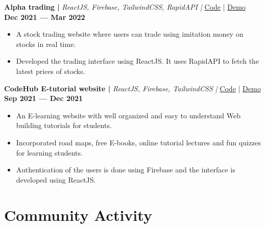 \documentclass[a4,10pt]{article}
\newenvironment{zitemize}{
\begin{itemize}\itemsep0pt \parskip0pt \parsep1pt}
{\end{itemize}\vspace{-0.5cm}}
\begin{document}
    
\vspace{0.35cm}
\textbf{Alpha trading | } \emph{ReactJS, Firebase, TailwindCSS, RapidAPI |  }{\href{https://github.com/Harsh-H-Shah/Alpha-trading}{
            \color{UI_blue} Code}}
            | 
            {\href{https://alpha-trading.netlify.app/}{
            \color{UI_blue} Demo} } \textbf{\hfill Dec 2021 --- Mar 2022} 
\vspace{-0.2cm}
    \begin{zitemize}
        \item A stock trading website where users can trade using imitation money on stocks in real time.
        \item Developed the trading interface using ReactJS. It uses RapidAPI to fetch the latest prices of stocks.
    \end{zitemize}


\vspace{0.35cm}
\textbf{CodeHub E-tutorial website | } \emph{ReactJS, Firebase, TailwindCSS |  }{\href{https://github.com/Harsh-H-Shah/codehub}{
            \color{UI_blue} Code}}
            | 
            {\href{https://code-hub-2021.netlify.app/}{
            \color{UI_blue} Demo} } \textbf{\hfill Sep 2021 --- Dec 2021}
    \vspace{-0.2cm}
    \begin{zitemize}
        \item An E-learning website with well organized and easy to understand Web building tutorials for students.
        \item Incorporated road maps, free E-books, online tutorial lectures and fun quizzes for learning students.
        \item Authentication of the users is done using Firebase and the interface is developed using ReactJS.
    \end{zitemize}
\vspace{-0.25cm}



\section{Community Activity}
\end{document}
